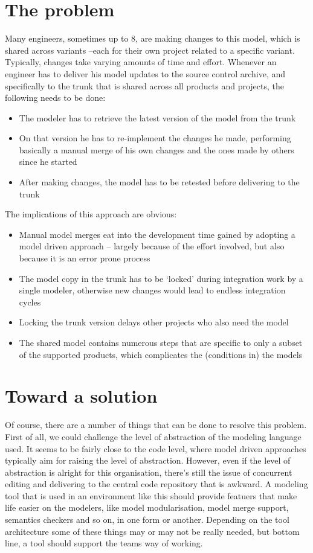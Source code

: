 \documentclass[11pt]{article} %
\begin{document}
\section{The problem}
Many engineers, sometimes up to 8, are making changes to this model, which is shared across variants –each for their own project related to a specific variant. Typically, changes take varying amounts of time and effort.
Whenever an engineer has to deliver his model updates to the source control archive, and specifically to the trunk that is shared across all products and projects, the following needs to be done:
\begin{itemize}
\item The modeler has to retrieve the latest version of the model from the trunk
\item On that version he has to re-implement the changes he made, performing basically a manual merge of his own changes and the ones made by others since he started
\item After making changes, the model has to be retested before delivering to the trunk
\end{itemize}
The implications of this approach are obvious:
\begin{itemize}
\item Manual model merges eat into the development time gained by adopting a model driven approach – largely because of the effort involved, but also because it is an error prone process
\item The model copy in the trunk has to be ‘locked’ during integration work by a single modeler, otherwise new changes would lead to endless integration cycles
\item Locking the trunk version delays other projects who also need the model
\item The shared model contains numerous steps that are specific to only a subset of the supported products, which complicates the (conditions in) the models
\end{itemize}

\section{Toward a solution}
Of course, there are a number of things that can be done to resolve this problem. First of all, we could challenge the level of abstraction of the modeling language used. It seems to be fairly close to the code level, where model driven approaches typically aim for raising the level of abstraction. However, even if the level of abstraction is alright for this organisation, there's still the issue of concurrent editing and delivering to the central code repository that is awkward. A modeling tool that is used in an environment like this should provide featuers that make life easier on the modelers, like model modularisation, model merge support, semantics checkers and so on, in one form or another. Depending on the tool architecture some of these things may or may not be really needed, but bottom line, a tool should support the teams way of working.
\end{document}
